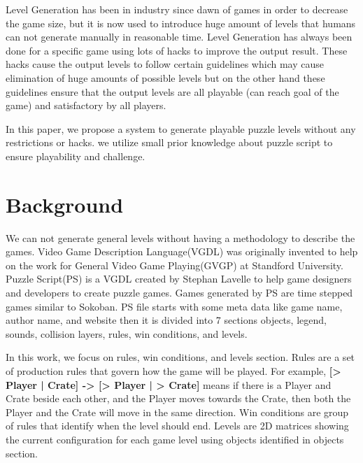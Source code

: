 \documentclass[letterpaper]{article}
\begin{document}
Level Generation has been in industry since dawn of games in order to decrease the game size, but it is now used to introduce huge amount of levels that humans can not generate manually in reasonable time. Level Generation has always been done for a specific game using lots of hacks to improve the output result. These hacks cause the output levels to follow certain guidelines which may cause elimination of huge amounts of possible levels but on the other hand these guidelines ensure that the output levels are all playable (can reach goal of the game) and satisfactory by all players\cite{mcGenerateEverything}.\\\par

In this paper, we propose a system to generate playable puzzle levels without any restrictions or hacks. we utilize small prior knowledge about puzzle script to ensure playability and challenge.

\section{Background}
We can not generate general levels without having a methodology to describe the games. Video Game Description Language(VGDL) was originally invented to help on the work for General Video Game Playing(GVGP)\cite{gvgp} at Standford University. Puzzle Script(PS) is a VGDL created by Stephan Lavelle to help game designers and developers to create puzzle games\cite{puzzleScript}. Games generated by PS are time stepped games similar to Sokoban\cite{sokoban}. PS file starts with some meta data like game name, author name, and website then it is divided into 7 sections objects, legend, sounds, collision layers, rules, win conditions, and levels.\\\par

In this work, we focus on rules, win conditions, and levels section. Rules are a set of production rules that govern how the game will be played. For example, \textbf{[> Player | Crate] -> [> Player | > Crate]} means if there is a Player and Crate beside each other, and the Player moves towards the Crate, then both the Player and the Crate will move in the same direction. Win conditions are group of rules that identify when the level should end. Levels are 2D matrices showing the current configuration for each game level using objects identified in objects section.
\end{document}
